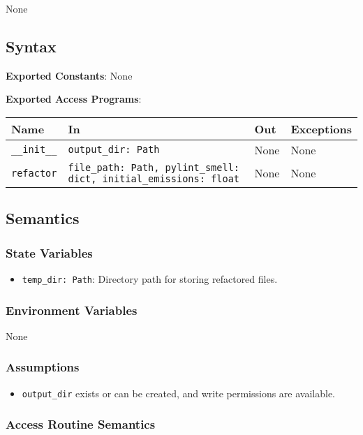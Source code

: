 \documentclass[12pt, titlepage]{article}
\begin{document}
None

\subsection{Syntax}
\noindent
\textbf{Exported Constants}: None

\noindent
\textbf{Exported Access Programs}:

\begin{tabularx}{\linewidth}{|l|>{\raggedright\arraybackslash}X|l|l|}
  \toprule Name & In & Out & Exceptions \\\hline
  \midrule
  \texttt{\_\_init\_\_} & \texttt{output\_dir: Path} & None & None \\\hline
  \texttt{refactor} & \texttt{file\_path: Path, pylint\_smell: dict, initial\_emissions: float} & None & None \\
  \hline
  \bottomrule
\end{tabularx}

\subsection{Semantics}

\subsubsection{State Variables}
\begin{itemize}
  \item \texttt{temp\_dir: Path}: Directory path for storing refactored files.
\end{itemize}

\subsubsection{Environment Variables}
None

\subsubsection{Assumptions}
\begin{itemize}
  \item \texttt{output\_dir} exists or can be created, and write permissions are available.
\end{itemize}

\subsubsection{Access Routine Semantics}
\end{document}
